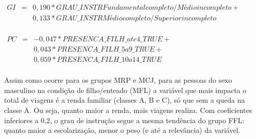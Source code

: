 \begin{math}
\begin{array} {rcl}
GI & = & 0,190*GRAU\_INSTRFundamental completo / Médio incompleto + \\
   &   & 0,133*GRAU\_INSTRMédio completo / Superior incompleto \\  
\end{array}
\end{math}

\begin{math}
\begin{array} {rcl}
PC & = & -0,047*PRESENCA\_FILH\_ate4\_TRUE + \\
   &   & 0,043*PRESENCA\_FILH\_5a9\_TRUE +\\
   &   & 0,059*PRESENCA\_FILH\_10a14\_TRUE \\  
\end{array}
\end{math}

Assim como ocorre para os grupos MRP e MCJ, para as pessoas do sexo masculino na condição de filho/enteado (MFL) a variável que mais impacta o total de viagens é a renda familiar (classes A, B e C), só que sem a queda na classe A. Ou seja, quanto maior a renda, mais viagens realiza.
Com coeficientes inferiores a 0,2, o grau de instrução segue a mesma tendência do grupo FFL: quanto maior a escolarização, menor o peso (e até a relevância) da variável.




